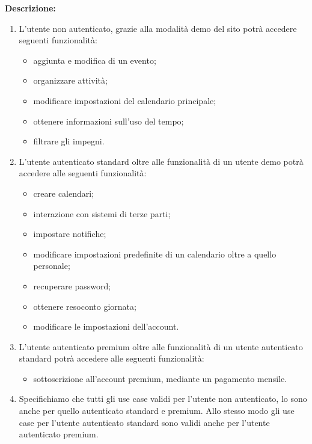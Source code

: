 \begin{listaPersonale}[UC]{}
    \textbf{Descrizione:}
    \begin{enumerate}
        \item L'utente non autenticato, grazie alla modalità demo del sito potrà accedere seguenti funzionalità:
              \begin{itemize}
                  \item aggiunta e modifica di un evento;
                  \item organizzare attività;
                  \item modificare impostazioni del calendario principale;
                  \item ottenere informazioni sull'uso del tempo;
                  \item filtrare gli impegni.
              \end{itemize}
        \item L'utente autenticato standard oltre alle funzionalità di un utente demo potrà accedere alle seguenti funzionalità:
              \begin{itemize}
                  \item creare calendari;
                  \item interazione con sistemi di terze parti;
                  \item impostare notifiche;
                  \item modificare impostazioni predefinite di un calendario oltre a quello personale;
                  \item recuperare password;
                  \item ottenere resoconto giornata;
                  \item modificare le impostazioni dell'account.
              \end{itemize}
        \item L'utente autenticato premium oltre alle funzionalità di un utente autenticato standard potrà accedere alle seguenti funzionalità:
              \begin{itemize}
                  \item sottoscrizione all'account premium, mediante un pagamento mensile.
              \end{itemize}
        \item Specifichiamo che tutti gli use case validi per l'utente non autenticato, lo sono anche per quello autenticato standard e premium. Allo stesso modo gli use case per l'utente autenticato standard sono validi anche per l'utente autenticato premium.
    \end{enumerate}



\end{listaPersonale}
